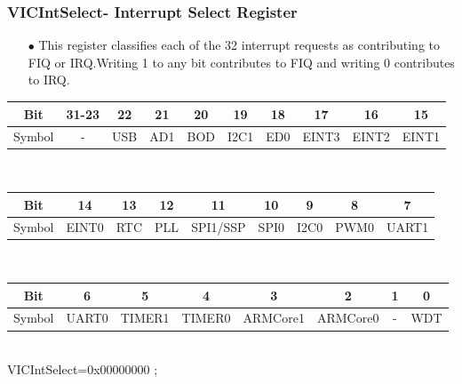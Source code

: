 \documentclass[table,10pt,red]{beamer}
\begin{document}
\begin{frame}
		\frametitle{VICIntSelect- Interrupt Select Register}
		\begin{itemize}
			\item[$\bullet$] This register classifies each of the 32 interrupt requests as contributing to FIQ or IRQ.Writing 1 to any bit contributes to FIQ and writing 0 contributes to IRQ. 
		\end{itemize}  \pause 
			\footnotesize
			\begin{tabular}{|c|c|c|c|c|c|c|c|c|c|}
				\hline Bit & 31-23 & 22 & 21 & 20 & 19 & 18 & 17 & 16 & 15 \\ 
				\hline Symbol & - & USB & AD1 & BOD & I2C1 & ED0 & EINT3 & EINT2 & EINT1 \\ 
				\hline 
			\end{tabular}
			\\[10pt]
			\begin{tabular}{|c|c|c|c|c|c|c|c|c|}
				\hline Bit & 14 & 13 & 12 & 11 & 10 & 9 & 8 & 7\\ 
				\hline Symbol & EINT0 & RTC & PLL & SPI1/SSP & SPI0 & I2C0 & PWM0 & UART1 \\ 
				\hline 
				\end{tabular}
				\\[10pt]
				\begin{tabular}{|c|c|c|c|c|c|c|c|}
					\hline Bit & 6 & 5 & 4 & 3 & 2 & 1 & 0 \\ 
					\hline Symbol & UART0 & TIMER1 & TIMER0 & ARMCore1 & ARMCore0 & - & WDT \\ 
					\hline 
					\end{tabular} 
					\\[10pt]
					\small
		VICIntSelect\hspace{1pt}=\hspace{1pt}\color{red}0x00000000 \color{black};
	\end{frame}
\end{document}
